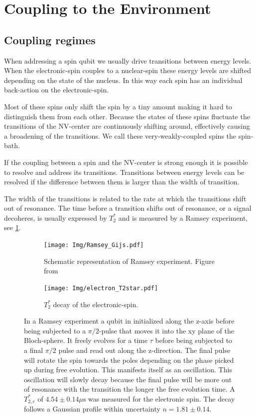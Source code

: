\section{Coupling to the Environment}


\subsection{Coupling regimes}
When addressing a spin qubit we usually drive transitions between energy levels.
When the electronic-spin couples to a nuclear-spin these energy levels are shifted depending on the state of the nucleus.
In this way each spin has an individual back-action on the electronic-spin.

Most of these spins only shift the spin by a tiny amount making it hard to distinguish them from each other.
Because the states of these spins fluctuate the transitions of the NV-center are continuously shifting around, effectively causing a broadening of the transitions.
We call these very-weakly-coupled spins the spin-bath.

If the coupling between a spin and the NV-center is strong enough it is possible to resolve and address its transitions.
Transitions between energy levels can be resolved if the difference between them is larger than the width of transition.


The width of the transitions is related to the rate at which the transitions shift out of resonance.
The time before a transition shifts out of resonance, or a signal decoheres, is usually expressed by $T_2^*$ and is measured by a Ramsey experiment, see \cref{fig:Ramsey_gijs}.

\begin{figure}[htbp]
    \centering
    \begin{subfigure}[t]{0.49\textwidth}\centering
    \texttt{[image: Img/Ramsey\_Gijs.pdf]}
    \caption{Schematic representation of Ramsey experiment. Figure from \citep{Lange2012Quantum}}
    \label{fig:Ramsey_gijs}
    \end{subfigure}
    \begin{subfigure}[t]{0.49\textwidth}\centering
        \texttt{[image: Img/electron\_T2star.pdf]}
    \caption{$T_2^*$ decay of the electronic-spin.}
    \label{fig:electron_T2*}
    \end{subfigure}
        \caption{In a Ramsey experiment a qubit in initialized along the z-axis before being subjected to a $\pi/2$-pulse that moves it into the xy plane of the Bloch-sphere. It freely evolves for a time $\tau$ before being subjected to a final $\pi/2$ pulse and read out along the z-direction.
The final pulse will rotate the spin towards the poles depending on the phase picked up during free evolution. This manifests itself as an oscillation. This oscillation will slowly decay because the final pulse will be more out of resonance with the transition the longer the free evolution time. A $T_{2,e}^*$ of $4.54 \pm 0.14 \mu\mathrm{s}$ was measured for the electronic spin. The decay follows a Gaussian profile within uncertainty $n = 1.81 \pm 0.14$. }
\end{figure}

